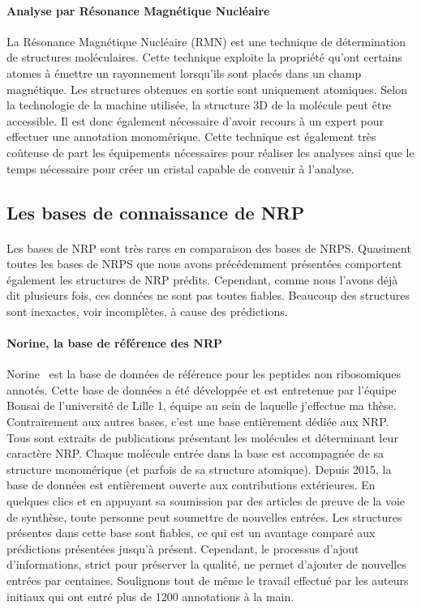 \documentclass[12pt,french,twoside]{report}
\begin{document}
\paragraph{Analyse par Résonance Magnétique Nucléaire}
La Résonance Magnétique Nucléaire (RMN) est une technique de détermination de structures moléculaires.
Cette technique exploite la propriété qu'ont certains atomes à émettre un rayonnement lorsqu'ils sont placés dans un champ magnétique.
Les structures obtenues en sortie sont uniquement atomiques.
Selon la technologie de la machine utilisée, la structure 3D de la molécule peut être accessible.
Il est donc également nécessaire d'avoir recours à un expert pour effectuer une annotation monomérique.
Cette technique est également très coûteuse de part les équipements nécessaires pour réaliser les analyses ainsi que le temps nécessaire pour créer un cristal capable de convenir à l'analyse.



\subsection{Les bases de connaissance de NRP}

\paragraph{}Les bases de NRP sont très rares en comparaison des bases de NRPS.
Quasiment toutes les bases de NRPS que nous avons précédemment présentées comportent également les structures de NRP prédits.
Cependant, comme nous l'avons déjà dit plusieurs fois, ces données ne sont pas toutes fiables.
Beaucoup des structures sont inexactes, voir incomplètes, à cause des prédictions.

\paragraph{Norine, la base de référence des NRP}
Norine~\cite{caboche_norine:_2008} est la base de données de référence pour les peptides non ribosomiques annotés.
Cette base de données a été développée et est entretenue par l'équipe Bonsai de l'université de Lille 1, équipe au sein de laquelle j'effectue ma thèse.
Contrairement aux autres bases, c'est une base entièrement dédiée aux NRP.
Tous sont extraits de publications présentant les molécules et déterminant leur caractère NRP.
Chaque molécule entrée dans la base est accompagnée de sa structure monomérique (et parfois de sa structure atomique).
Depuis 2015, la base de données est entièrement ouverte aux contributions extérieures.
En quelques clics et en appuyant sa soumission par des articles de preuve de la voie de synthèse, toute personne peut soumettre de nouvelles entrées.
Les structures présentes dans cette base sont fiables, ce qui est un avantage comparé aux prédictions présentées jusqu'à présent.
Cependant, le processus d'ajout d'informations, strict pour préserver la qualité, ne permet d'ajouter de nouvelles entrées par centaines.
Soulignons tout de même le travail effectué par les auteurs initiaux qui ont entré plus de 1200 annotations à la main.
\end{document}
